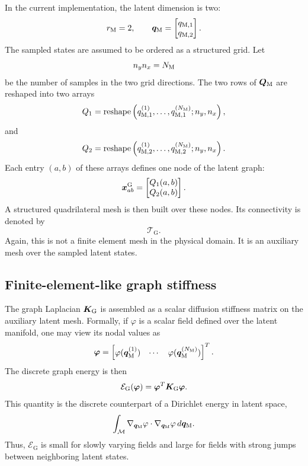 \documentclass[11pt,a4paper]{article}
\begin{document}
In the current implementation, the latent dimension is two:
\[
        r_{\mathrm{M}} = 2,
        \qquad
        \bm q_{\mathrm{M}} =
        \begin{bmatrix}
        q_{\mathrm{M},1}\\
        q_{\mathrm{M},2}
        \end{bmatrix}.
\]
The sampled states are assumed to be ordered as a structured grid. Let
\[
        n_y n_x = N_{\mathrm{M}}
\]
be the number of samples in the two grid directions. The two rows of $\bm Q_{\mathrm{M}}$
are reshaped into two arrays
\[
        Q_1 =
        \operatorname{reshape}
        \left(
        q_{\mathrm{M},1}^{(1)},\ldots,q_{\mathrm{M},1}^{(N_{\mathrm{M}})};
        n_y,n_x
        \right),
\]
and
\[
        Q_2 =
        \operatorname{reshape}
        \left(
        q_{\mathrm{M},2}^{(1)},\ldots,q_{\mathrm{M},2}^{(N_{\mathrm{M}})};
        n_y,n_x
        \right).
\]
Each entry $(a,b)$ of these arrays defines one node of the latent graph:
\[
        \bm x^{\mathrm{G}}_{ab}
        =
        \begin{bmatrix}
        Q_1(a,b)\\
        Q_2(a,b)
        \end{bmatrix}.
\]
A structured quadrilateral mesh is then built over these nodes. Its
connectivity is denoted by
\[
        \mathcal{T}_{\mathrm{G}}.
\]
Again, this is not a finite element mesh in the physical domain. It is an
auxiliary mesh over the sampled latent states.

\subsection{Finite-element-like graph stiffness}

The graph Laplacian $\bm K_{\mathrm{G}}$ is assembled as a scalar diffusion stiffness
matrix on the auxiliary latent mesh. Formally, if $\varphi$ is a scalar field
defined over the latent manifold, one may view its nodal values as
\[
        \bm\varphi =
        \begin{bmatrix}
        \varphi(\bm q_{\mathrm{M}}^{(1)}) &
        \cdots &
        \varphi(\bm q_{\mathrm{M}}^{(N_{\mathrm{M}})})
        \end{bmatrix}^T .
\]
The discrete graph energy is then
\[
        \mathcal{E}_{\mathrm{G}}(\bm\varphi)
        =
        \bm\varphi^T\bm K_{\mathrm{G}}\bm\varphi.
        \label{eq:graph_energy_scalar}
\]
This quantity is the discrete counterpart of a Dirichlet energy in latent
space,
\[
        \int_{\mathcal{M}}
        \nabla_{\bm q_{\mathrm{M}}}\varphi\cdot\nabla_{\bm q_{\mathrm{M}}}\varphi
        \,d\bm q_{\mathrm{M}}.
\]
Thus, $\mathcal{E}_{\mathrm{G}}$ is small for slowly varying fields and large
for fields with strong jumps between neighboring latent states.
\end{document}
